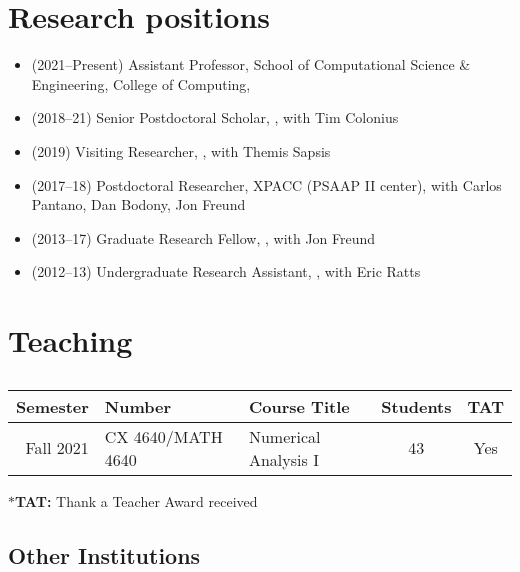 \section{Research positions}

\begin{itemize}
    \item (2021--Present) Assistant Professor, School of Computational Science \& Engineering, College of Computing, \GIT
    \item (2018--21) Senior Postdoctoral Scholar, \CIT, with Tim Colonius
    \item (2019) Visiting Researcher, \MIT, with Themis Sapsis
    \item (2017--18) Postdoctoral Researcher, XPACC (PSAAP II center), with Carlos Pantano, Dan Bodony, Jon Freund
    \item (2013--17) Graduate Research Fellow, \UIUC, with Jon Freund
    \item (2012--13) Undergraduate Research Assistant, \UMD, with Eric Ratts
\end{itemize}

\section{Teaching}

\subsection{\GIT}

\begin{center}
    \begin{tabular}{ r l l c c }
        \hline
        \bf Semester  &\bf Number & \bf Course Title & \bf Students & \bf TAT \\
        \hline
        Fall 2021 & CX 4640/MATH 4640 & Numerical Analysis I & 43 & Yes \\
        \hline\hline
    \end{tabular}
\end{center}
$\ast$\textbf{TAT:} Thank a Teacher Award received

\subsection{Other Institutions}

